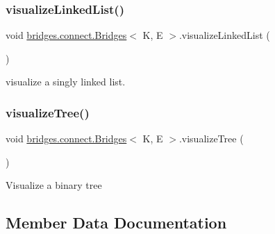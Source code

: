 \hypertarget{classbridges_1_1connect_1_1_bridges_ae9ce2673d2eef1da7f6e1359c494f6fe}{}\label{classbridges_1_1connect_1_1_bridges_ae9ce2673d2eef1da7f6e1359c494f6fe} 
\subsubsection{\texorpdfstring{visualize\+Linked\+List()}{visualizeLinkedList()}}
{\footnotesize\ttfamily void \hyperlink{classbridges_1_1connect_1_1_bridges}{bridges.\+connect.\+Bridges}$<$ K, E $>$.visualize\+Linked\+List (\begin{DoxyParamCaption}{ }\end{DoxyParamCaption})\hspace{0.3cm}{\ttfamily [protected]}}

visualize a singly linked list. \hypertarget{classbridges_1_1connect_1_1_bridges_abd8fa1ef8d6c5d3e6c533ee069d24d85}{}\label{classbridges_1_1connect_1_1_bridges_abd8fa1ef8d6c5d3e6c533ee069d24d85} 
\subsubsection{\texorpdfstring{visualize\+Tree()}{visualizeTree()}}
{\footnotesize\ttfamily void \hyperlink{classbridges_1_1connect_1_1_bridges}{bridges.\+connect.\+Bridges}$<$ K, E $>$.visualize\+Tree (\begin{DoxyParamCaption}{ }\end{DoxyParamCaption})\hspace{0.3cm}{\ttfamily [protected]}}

Visualize a binary tree 

\subsection{Member Data Documentation}
\hypertarget{classbridges_1_1connect_1_1_bridges_af3fc35779b31c976ed8bf2e173310502}{}\label{classbridges_1_1connect_1_1_bridges_af3fc35779b31c976ed8bf2e173310502} 
